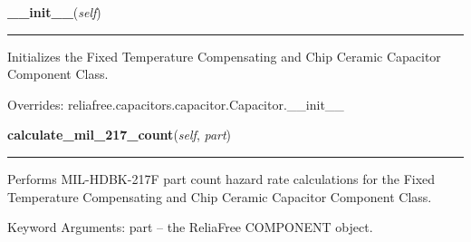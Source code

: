     \vspace{0.5ex}

\hspace{.8\funcindent}\begin{boxedminipage}{\funcwidth}

    \raggedright \textbf{\_\_init\_\_}(\textit{self})

    \vspace{-1.5ex}

    \rule{\textwidth}{0.5\fboxrule}
\setlength{\parskip}{2ex}
    Initializes the Fixed Temperature Compensating and Chip Ceramic 
    Capacitor Component Class.

\setlength{\parskip}{1ex}
      Overrides: reliafree.capacitors.capacitor.Capacitor.\_\_init\_\_

    \end{boxedminipage}

    \label{reliafree:capacitors:fixed:CeramicChip:calculate_mil_217_count}

    \vspace{0.5ex}

\hspace{.8\funcindent}\begin{boxedminipage}{\funcwidth}

    \raggedright \textbf{calculate\_mil\_217\_count}(\textit{self}, \textit{part})

    \vspace{-1.5ex}

    \rule{\textwidth}{0.5\fboxrule}
\setlength{\parskip}{2ex}
    Performs MIL-HDBK-217F part count hazard rate calculations for the 
    Fixed Temperature Compensating and Chip Ceramic Capacitor Component 
    Class.

    Keyword Arguments: part -- the ReliaFree COMPONENT object.

\setlength{\parskip}{1ex}
    \end{boxedminipage}

    \label{reliafree:capacitors:fixed:CeramicChip:calculate_mil_217_stress}

